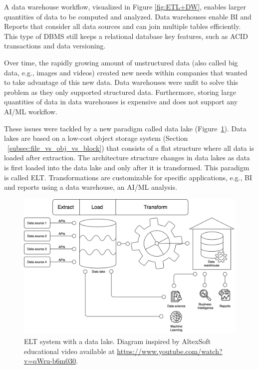 A data warehouse workflow, visualized in Figure \ref{fig:ETL+DW}, enables larger quantities of data to be computed and analyzed. Data warehouses enable \gls{BI} and Reports that consider all data sources and can join multiple tables efficiently. This type of \gls{DBMS} still keeps a relational database key features, such as \gls{ACID} transactions and data versioning.

Over time, the rapidly growing amount of unstructured data (also called big data, e.g., images and videos) created new needs within companies that wanted to take advantage of this new data. Data warehouses were unfit to solve this problem as they only supported structured data. Furthermore, storing large quantities of data in data warehouses is expensive and does not support any \gls{AI}/\gls{ML} workflow.

These issues were tackled by a new paradigm called data lake (Figure~\ref{fig:ELT+DL}). Data lakes are based on a low-cost object storage system (Section ~\ref{subsec:file_vs_obj_vs_block}) that consists of a flat structure where all data is loaded after extraction. The architecture structure changes in data lakes as data is first loaded into the data lake and only after it is transformed. This paradigm is called \gls{ELT}. Transformations are customizable for specific applications, e.g., \gls{BI} and reports using a data warehouse, an \gls{AI}/\gls{ML} analysis.

\begin{figure}[!ht]
    \begin{center}
      \includegraphics[width=\textwidth]{figures/2-background/DeltaLake_evolution-ELT+DL.png}
    \end{center}
    \caption[ELT system with a data lake]{\gls{ELT} system with a data lake. Diagram inspired by AltexSoft educational video available at \url{https://www.youtube.com/watch?v=qWru-b6m030}.}
    \label{fig:ELT+DL}
\end{figure}

